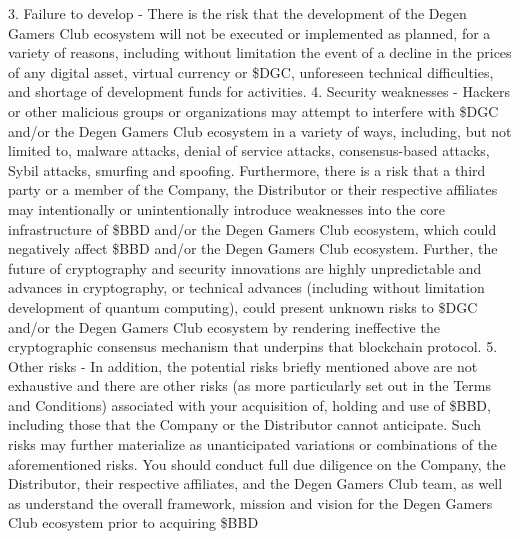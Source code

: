 \documentclass[
]{book}
\begin{document}
3. Failure to develop - There is the risk that the development of the Degen Gamers Club ecosystem will not be executed or implemented as planned, for a variety of reasons, including without limitation the event of a decline in the prices of any digital asset, virtual currency or \$DGC, unforeseen technical difficulties, and shortage of development funds for activities.
4. Security weaknesses - Hackers or other malicious groups or organizations may attempt to interfere with \$DGC and/or the Degen Gamers Club ecosystem in a variety of ways, including, but not limited to, malware attacks, denial of service attacks, consensus-based attacks, Sybil attacks, smurfing and spoofing. Furthermore, there is a risk that a third party or a member of the Company, the Distributor or their respective affiliates may intentionally or unintentionally introduce weaknesses into the core infrastructure of \$BBD and/or the Degen Gamers Club ecosystem, which could negatively affect \$BBD and/or the Degen Gamers Club ecosystem. Further, the future of cryptography and security innovations are highly unpredictable and advances in cryptography, or technical advances (including without limitation development of quantum computing), could present unknown risks to \$DGC and/or the Degen Gamers Club ecosystem by rendering ineffective the cryptographic consensus mechanism that underpins that blockchain protocol.
5. Other risks - In addition, the potential risks briefly mentioned above are not exhaustive and there are other risks (as more particularly set out in the Terms and Conditions) associated with your acquisition of, holding and use of \$BBD, including those that the Company or the Distributor cannot anticipate. Such risks may further materialize as unanticipated variations or combinations of the aforementioned risks. You should conduct full due diligence on the Company, the Distributor, their respective affiliates, and the Degen Gamers Club team, as well as understand the overall framework, mission and vision for the Degen Gamers Club ecosystem prior to acquiring \$BBD

  
\end{document}
